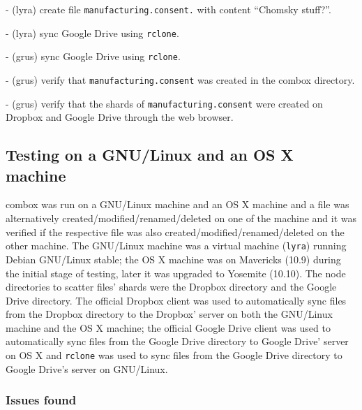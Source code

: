  - (lyra) create file \verb+manufacturing.consent.+ with content ``Chomsky stuff?''.

 - (lyra) sync Google Drive using \verb+rclone+.

 - (grus) sync Google Drive using \verb+rclone+.

 - (grus) verify that \verb+manufacturing.consent+ was created in the
 combox directory.

 - (grus) verify that the shards of \verb+manufacturing.consent+ were
 created on Dropbox and Google Drive through the web browser.

\subsection{Testing on a GNU/Linux and an OS X machine}

combox was run on a GNU/Linux machine and an OS X machine and a file
was alternatively created/modified/renamed/deleted on one of the
machine and it was verified if the respective file was also
created/modified/renamed/deleted on the other machine. The GNU/Linux
machine was a virtual machine (\verb+lyra+) running Debian GNU/Linux
stable; the OS X machine was on Mavericks (10.9) during the initial
stage of testing, later it was upgraded to Yosemite (10.10). The node
directories to scatter files' shards were the Dropbox directory and
the Google Drive directory. The official Dropbox client was used to
automatically sync files from the Dropbox directory to the Dropbox'
server on both the GNU/Linux machine and the OS X machine; the
official Google Drive client was used to automatically sync files from
the Google Drive directory to Google Drive' server on OS X and
\verb+rclone+\cite{program:rclone} was used to sync files from the
Google Drive directory to Google Drive's server on GNU/Linux.

\subsubsection{Issues found}

